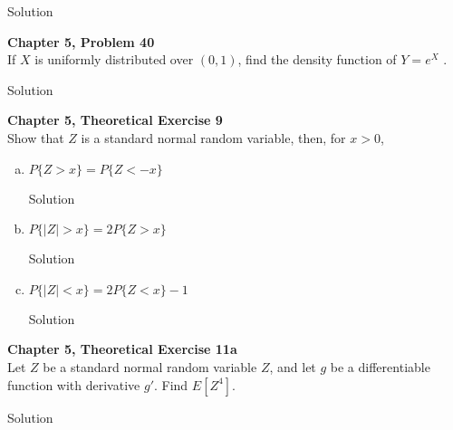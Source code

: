 \documentclass{article}
\begin{document}
\begin{spacing}{1.1}
\begin{homeworkProblem}
\begin{homeworkSection}{Solution}
  \end{homeworkSection}
\end{homeworkProblem}

\newpage
\begin{homeworkProblem}
  {\bf Chapter 5, Problem 40}\\
  If $X$ is uniformly distributed over $(0, 1)$, find the density 
  function of $Y = e^X$ .
  \begin{homeworkSection}{Solution}
    
  \end{homeworkSection}
\end{homeworkProblem}

\newpage
\begin{homeworkProblem}
  {\bf Chapter 5, Theoretical Exercise 9}\\
  Show that $Z$ is a standard normal random variable,
  then, for $x > 0$,
  \begin{enumerate}[(a)]
    \item $P\{ Z > x\} = P\{ Z < −x\}$
      \begin{homeworkSection}{Solution}
        
      \end{homeworkSection}
    \item $P\{ |Z| > x\} = 2 P\{ Z > x\}$
      \begin{homeworkSection}{Solution}
        
      \end{homeworkSection}
    \item $P\{ |Z| < x \} = 2 P\{ Z < x \} − 1$
      \begin{homeworkSection}{Solution}
        
      \end{homeworkSection}
    \end{enumerate}
\end{homeworkProblem}

\newpage
\begin{homeworkProblem}
  {\bf Chapter 5, Theoretical Exercise 11a}\\
  Let $Z$ be a standard normal random variable $Z$, and let 
  $g$ be a differentiable function with derivative $g'$.
  Find $E[ Z^4]$.
  \begin{homeworkSection}{Solution}
    

\end{homeworkSection}
\end{homeworkProblem}
\end{spacing}
\end{document}
